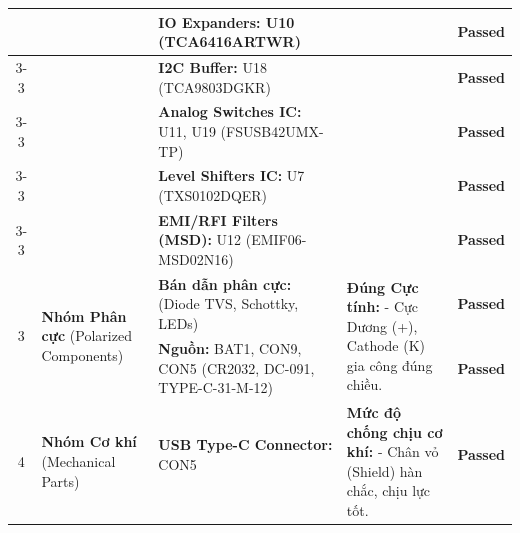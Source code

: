 \begin{longtable}{|c|p{2.5cm}|p{5cm}|p{4cm}|c|}
                & & \textbf{IO Expanders:} U10 \newline (TCA6416ARTWR)
                & & \textcolor{modern_blue}{\textbf{Passed}} \\ \cline{3-3} \cline{5-5}
        
                & & \textbf{I2C Buffer:} U18 \newline (TCA9803DGKR)
                & & \textcolor{modern_blue}{\textbf{Passed}} \\ \cline{3-3} \cline{5-5}
        
                & & \textbf{Analog Switches IC:} U11, U19 \newline (FSUSB42UMX-TP)
                & & \textcolor{modern_blue}{\textbf{Passed}} \\ \cline{3-3} \cline{5-5}
        
                & & \textbf{Level Shifters IC:} U7 \newline (TXS0102DQER)
                & & \textcolor{modern_blue}{\textbf{Passed}} \\ \cline{3-3} \cline{5-5}
        
                & & \textbf{EMI/RFI Filters (MSD):} U12 \newline (EMIF06-MSD02N16)
                & & \textcolor{modern_blue}{\textbf{Passed}} \\ \hline
        
            \multirow{2}{*}{3} & \multirow{2}{3cm}{\textbf{Nhóm Phân cực} \newline (Polarized Components)}
                & \textbf{Bán dẫn phân cực:} \newline (Diode TVS, Schottky, LEDs)
                & \multirow{2}{4cm}{\textbf{Đúng Cực tính:} \newline - Cực Dương (+), Cathode (K) gia công đúng chiều.}
                & \textcolor{modern_blue}{\textbf{Passed}} \\ \cline{3-3} \cline{5-5}
        
                & & \textbf{Nguồn:} BAT1, CON9, CON5 \newline (CR2032, DC-091, TYPE-C-31-M-12)
                & & \textcolor{modern_blue}{\textbf{Passed}} \\ \hline
        
            \multirow{8}{*}{4} & \multirow{8}{3cm}{\textbf{Nhóm Cơ khí} \newline (Mechanical Parts)}
                & \textbf{USB Type-C Connector:} CON5
                & \multirow{8}{4cm}{\textbf{Mức độ chống chịu cơ khí:} \newline - Chân vỏ (Shield) hàn chắc, chịu lực tốt.}
                & \textcolor{modern_blue}{\textbf{Passed}} \\ \cline{3-3} \cline{5-5}
        

\end{longtable}
